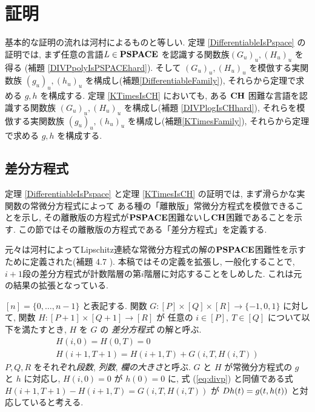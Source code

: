 \section{証明}
\label{section:differentiable}

基本的な証明の流れは河村によるものと等しい\cite{kawamura2010lipschitz}.
定理 \ref{DifferentiableIsPspace} の証明では,
まず任意の言語$L \in \mathbf{PSPACE}$ を認識する関数族$(G_u)_u, (H_u)_u$ を得る
(補題 \ref{DIVPpolyIsPSPACEhard}).
そして $(G_u)_u, (H_u)_u$ を模倣する実関数族 $(g_u)_u, (h_u)_u$ を構成し(補題\ref{DifferentiableFamily}),
それらから定理で求める $g, h$ を構成する.
定理 \ref{KTimesIsCH} においても, ある $\mathbf{CH}$ 困難な言語を認識する関数族
$(G_u)_u, (H_u)_u$ を構成し(補題 \ref{DIVPlogIsCHhard}),
それらを模倣する実関数族 $(g_u)_u, (h_u)_u$ を構成し(補題\ref{KTimesFamily}),
それらから定理で求める $g, h$ を構成する.



\subsection{差分方程式}
\label{section:divp}

定理 \ref{DifferentiableIsPspace} と定理 \ref{KTimesIsCH} の証明では,
まず滑らかな実関数の常微分方程式によって
ある種の「離散版」常微分方程式を模倣できることを示し, 
その離散版の方程式が$\mathbf{PSPACE}$困難ないし$\mathbf{CH}$困難であることを示す.
この節ではその離散版の方程式である「差分方程式」を定義する.

元々は河村によってLipschitz連続な常微分方程式の解の$\mathbf{PSPACE}$困難性を示すために定義された(補題 4.7 \cite{kawamura2010lipschitz}).
本稿ではその定義を拡張し, 一般化することで,
$i+1$段の差分方程式が計数階層の第$i$階層に対応することをしめした.
これは元の結果の拡張となっている.


$[n] = \{0, \dots , n-1\}$ と表記する.
関数 $G \colon [P] \times [Q] \times [R] \to \{-1, 0, 1\}$ に対して,
関数 $H \colon [P + 1] \times [Q+1] \to [R]$ が
任意の $i \in [P],\ T \in [Q]$ について以下を満たすとき,
$H$ を $G$ の \emph{差分方程式} の解と呼ぶ.
\begin{gather}
   H(i, 0) = H(0, T) = 0 
\\
   H(i + 1, T + 1) = H(i+1, T) + G(i, T, H(i, T))  \label{eq:divp}
\end{gather}
$P, Q, R$ をそれぞれ\emph{段数}, \emph{列数}, \emph{欄の大きさ}と呼ぶ.
$G$ と $H$ が常微分方程式の $g$ と $h$ に対応し,
$H(i, 0) = 0$ が $h(0) = 0$ に,
式 (\ref{eq:divp}) と同値である式 $H(i + 1, T + 1) - H(i+1, T) = G(i, T, H(i, T))$
が $D h(t) = g(t, h(t))$ と対応していると考える.

